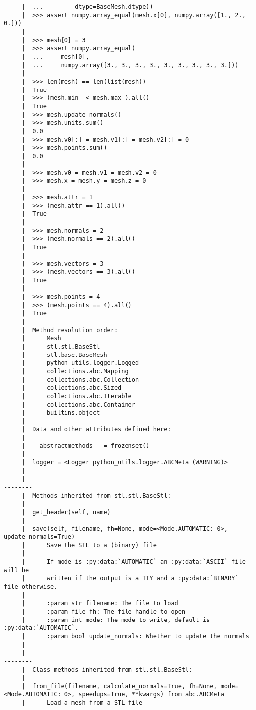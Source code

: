 \documentclass[12pt,fleqn]{article}\usepackage{../../common}
\begin{document}
\begin{verbatim}
     |  ...         dtype=BaseMesh.dtype))
     |  >>> assert numpy.array_equal(mesh.x[0], numpy.array([1., 2., 0.]))
     |  
     |  >>> mesh[0] = 3
     |  >>> assert numpy.array_equal(
     |  ...     mesh[0],
     |  ...     numpy.array([3., 3., 3., 3., 3., 3., 3., 3., 3.]))
     |  
     |  >>> len(mesh) == len(list(mesh))
     |  True
     |  >>> (mesh.min_ < mesh.max_).all()
     |  True
     |  >>> mesh.update_normals()
     |  >>> mesh.units.sum()
     |  0.0
     |  >>> mesh.v0[:] = mesh.v1[:] = mesh.v2[:] = 0
     |  >>> mesh.points.sum()
     |  0.0
     |  
     |  >>> mesh.v0 = mesh.v1 = mesh.v2 = 0
     |  >>> mesh.x = mesh.y = mesh.z = 0
     |  
     |  >>> mesh.attr = 1
     |  >>> (mesh.attr == 1).all()
     |  True
     |  
     |  >>> mesh.normals = 2
     |  >>> (mesh.normals == 2).all()
     |  True
     |  
     |  >>> mesh.vectors = 3
     |  >>> (mesh.vectors == 3).all()
     |  True
     |  
     |  >>> mesh.points = 4
     |  >>> (mesh.points == 4).all()
     |  True
     |  
     |  Method resolution order:
     |      Mesh
     |      stl.stl.BaseStl
     |      stl.base.BaseMesh
     |      python_utils.logger.Logged
     |      collections.abc.Mapping
     |      collections.abc.Collection
     |      collections.abc.Sized
     |      collections.abc.Iterable
     |      collections.abc.Container
     |      builtins.object
     |  
     |  Data and other attributes defined here:
     |  
     |  __abstractmethods__ = frozenset()
     |  
     |  logger = <Logger python_utils.logger.ABCMeta (WARNING)>
     |  
     |  ----------------------------------------------------------------------
     |  Methods inherited from stl.stl.BaseStl:
     |  
     |  get_header(self, name)
     |  
     |  save(self, filename, fh=None, mode=<Mode.AUTOMATIC: 0>, update_normals=True)
     |      Save the STL to a (binary) file
     |      
     |      If mode is :py:data:`AUTOMATIC` an :py:data:`ASCII` file will be
     |      written if the output is a TTY and a :py:data:`BINARY` file otherwise.
     |      
     |      :param str filename: The file to load
     |      :param file fh: The file handle to open
     |      :param int mode: The mode to write, default is :py:data:`AUTOMATIC`.
     |      :param bool update_normals: Whether to update the normals
     |  
     |  ----------------------------------------------------------------------
     |  Class methods inherited from stl.stl.BaseStl:
     |  
     |  from_file(filename, calculate_normals=True, fh=None, mode=<Mode.AUTOMATIC: 0>, speedups=True, **kwargs) from abc.ABCMeta
     |      Load a mesh from a STL file

\end{verbatim}
\end{document}
